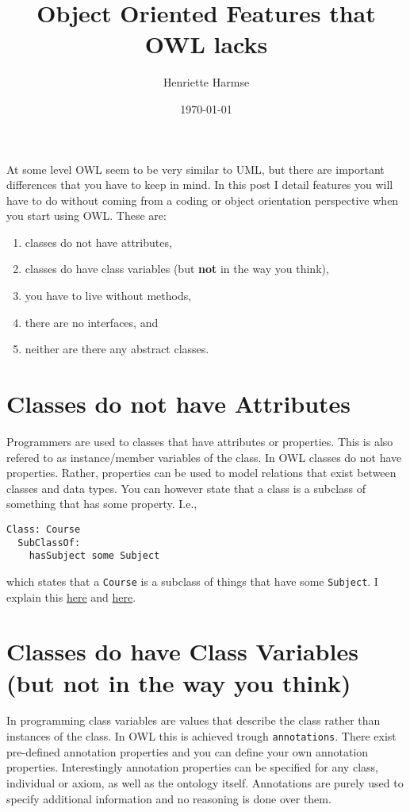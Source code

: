 \documentclass{amsart}
\title{Object Oriented Features that OWL lacks}
\author{Henriette Harmse}
\date{\today}
\begin{document}
  \maketitle
  At some level OWL seem to be very similar to UML, but there are important differences that you have to keep in mind.
  In this post I detail features you will have to do without coming from a coding or object orientation perspective when you start using OWL. These are:
  \begin{enumerate}
   \item classes do not have attributes,
   \item classes do have class variables (but \textbf{not} in the way you think),
   \item you have to live without methods,
   \item there are no interfaces, and
   \item neither are there any abstract classes.
  \end{enumerate}

  
  \section{Classes do not have Attributes}
  Programmers are used to classes that have attributes or properties. This is also refered to as instance/member variables of the class. In OWL classes do not have properties. Rather, properties can be used to model relations that exist between classes and data types. You can however state that a class is a subclass of something that has some property. I.e., 
\begin{verbatim}
Class: Course
  SubClassOf: 
    hasSubject some Subject  
\end{verbatim}
which states that a \texttt{Course} is a subclass of things that have some \texttt{Subject}. I explain this \href{https://henrietteharmse.com/2017/09/09/a-simple-class/}{here} and \href{https://henrietteharmse.com/2017/09/10/add-some-more-attributes/}{here}.
  
  \section{Classes do have Class Variables (but \textbf{not} in the way you think)}
  In programming class variables are values that describe the class rather than instances of the class. In OWL this is achieved trough \texttt{annotations}. There exist pre-defined annotation properties and you can define your own annotation properties. Interestingly annotation properties can be specified for any class, individual or axiom, as well as the ontology itself. Annotations are purely used to specify additional information and no reasoning is done over them.
  
\end{document}
